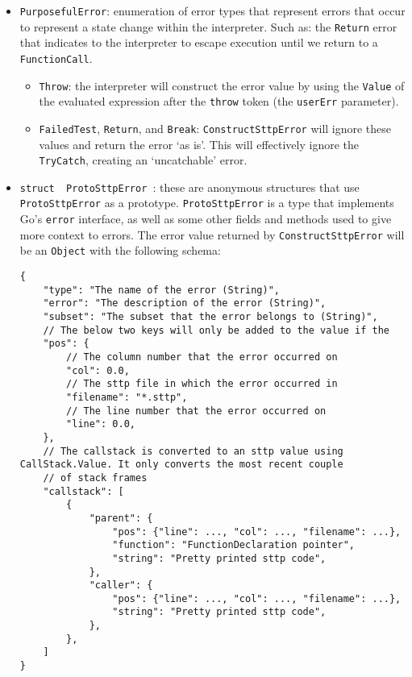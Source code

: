 \begin{itemize}
    \item \verb|PurposefulError|: enumeration of error types that represent errors that occur to represent a state change within the interpreter. Such as: the \verb|Return| error that indicates to the interpreter to escape execution until we return to a \verb|FunctionCall|.
    \begin{itemize}
        \item \verb|Throw|: the interpreter will construct the error value by using the \verb|Value| of the evaluated expression after the \verb|throw| token (the \verb|userErr| parameter).
        \item \verb|FailedTest|, \verb|Return|, and \verb|Break|: \verb|ConstructSttpError| will ignore these values and return the error `as is'. This will effectively ignore the \verb|TryCatch|, creating an `uncatchable' error.
    \end{itemize}
    \item \texttt{struct { ProtoSttpError }}: these are anonymous structures that use \verb|ProtoSttpError| as a prototype. \verb|ProtoSttpError| is a type that implements Go's \texttt{error} interface, as well as some other fields and methods used to give more context to errors. The error value returned by \verb|ConstructSttpError| will be an \verb|Object| with the following schema:
    \begin{verbatim}
{
    "type": "The name of the error (String)",
    "error": "The description of the error (String)",
    "subset": "The subset that the error belongs to (String)",
    // The below two keys will only be added to the value if the 
    "pos": {
        // The column number that the error occurred on
        "col": 0.0,
        // The sttp file in which the error occurred in
        "filename": "*.sttp",
        // The line number that the error occurred on
        "line": 0.0,
    },
    // The callstack is converted to an sttp value using CallStack.Value. It only converts the most recent couple 
    // of stack frames
    "callstack": [
        {
            "parent": {
                "pos": {"line": ..., "col": ..., "filename": ...},
                "function": "FunctionDeclaration pointer",
                "string": "Pretty printed sttp code",
            },
            "caller": {
                "pos": {"line": ..., "col": ..., "filename": ...},
                "string": "Pretty printed sttp code",
            },
        },
    ]
}
    \end{verbatim}
\end{itemize}

